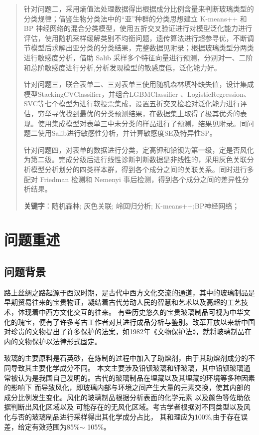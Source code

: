 \documentclass[UTF8]{ctexart}
\begin{document}
\begin{abstract}
    针对问题二，采用熵值法处理数据得出根据成分比例含量来判断玻璃类型的分类规律；借鉴生物分类法中的“亚”种群的分类思想建立 K-means++ 和BP 神经网络的混合分类模型，使用五折交叉验证进行对模型泛化能力进行评估，使用随机采样缓解类别不均衡问题，遗传算法进行超参寻优，不断调节模型后求解出亚分类的分类结果，完整数据见附录；根据玻璃类型分两类进行敏感度分析，借助 Salib 采样多个特征向量进行预测，分别对一、二阶和总阶敏感度进行分析,分析发现模型的敏感度低，泛化能力好。

    针对问题三，联合表单二、三对表单三使用随机森林填补缺失值，设计集成模型StackingCVClassifier，并组合LGBMClassifier 、LogisticRegression、SVC等七个模型为进行软投票集成，设置五折交叉检验对泛化能力进行评估，穷举寻优找到最优的分类预测结果，在数据集上取得了极其优秀的表现。使用集成模型对表单三中未分类的样品进行了预测，结果见附录。同问题二使用Salib进行敏感性分析，并计算敏感度SE及特异性SP。

    针对问题四，对表单的数据进行分类，定高钾和铅钡为第一级，定是否风化为第二级。完成分级后进行线性诊断判断数据是非线性的，采用灰色关联分析模型分析划分的四类样本群，得到各个成分之间的关联关系。同时进行多配对 Friedman 检测和 Nemenyi 事后检测，得到各个成分之间的差异性分析结果。

    \vspace{4em}
    \thispagestyle{empty}
    \textbf{关键字}：随机森林; 灰色关联;  岭回归分析; K-means++;BP神经网络；   %
\end{abstract}



\setcounter{page}{1}  %

\section{问题重述}

\subsection{问题背景}
路上丝绸之路起源于西汉时期，是古代中西方文化交流的通道，其中的玻璃制品是早期贸易往来的宝贵物证，凝结着古代劳动人民的智慧和艺术以及高超的工艺技术，体现着中西方文化交互的往来。
有些历史悠久的宝贵玻璃制品可视为中华文化的瑰宝，便有了许多考古工作者对其进行成品分析与鉴别。改革开放以来新中国对珍贵的文物提出了许多保护的法案，如1982年《文物保护法》，就将玻璃制品在内的文物保护以法律形式固定。

玻璃的主要原料是石英砂，在炼制的过程中加入了助熔剂，由于其助熔剂成分的不同导致其主要化学成分不同。
本文主要涉及铅钡玻璃和钾玻璃，其中铅钡玻璃通常被认为是我国自己发明的。古代的玻璃制品在埋藏以及其埋藏的环境等多种因素的影响下
而导致风化，即玻璃内部与环境之间产生大量的元素交换，使其内部的成分比例发生变化。风化的玻璃制品根据分析表面的化学元素
以及颜色等佐助依据判断出风化区域以及
可能存在的无风化区域。考古学者根据对不同类型以及风化与否的玻璃制品进行采样得出其化学成分占比，
其和理应为100$\%$,由于存在误差，给定有效范围为85$\%$$ \sim $ 105$\%$。
\end{document}
